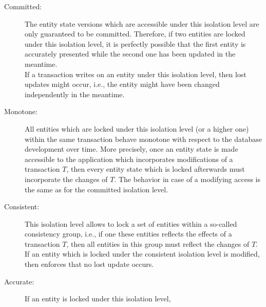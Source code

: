 \documentclass[a4paper, 10pt]{book}
\begin{document}
                            \begin{description}
                                \item[Committed:] The entity state versions which are accessible under
                                    this isolation level are only guaranteed to be committed. Therefore,
                                    if two entities are locked under this isolation level, it is
                                    perfectly possible that the first entity is accurately presented
                                    while the second one has been updated in the meantime.\\
                                    If a transaction writes on an entity under this isolation level,
                                    then lost updates might occur, i.e., the entity might have been
                                    changed independently in the meantime.
                                \item[Monotone:] All entities which are locked under this isolation
                                    level (or a higher one) within the same transaction behave monotone
                                    with respect to the database development over time. More precisely,
                                    once an entity state is made accessible to the application which
                                    incorporates modifications of a transaction $T$, then every entity
                                    state which is locked afterwards must incorporate the changes of
                                    $T$.
                                    The behavior in case of a modifying access is the same as for the
                                    committed isolation level. 
                                \item[Consistent:] This isolation level allows to lock a set of
                                    entities within a so-called consistency group, i.e., if one these
                                    entities reflects the effects of a transaction $T$, then all
                                    entities in this group must reflect the changes of $T$.
                                    If an entity which is locked under the consistent isolation level is
                                    modified, then \SYNEIGHT enforces that no lost update occurs. 
                                \item[Accurate:] If an entity is locked under this isolation level,

\end{description}
\end{document}
